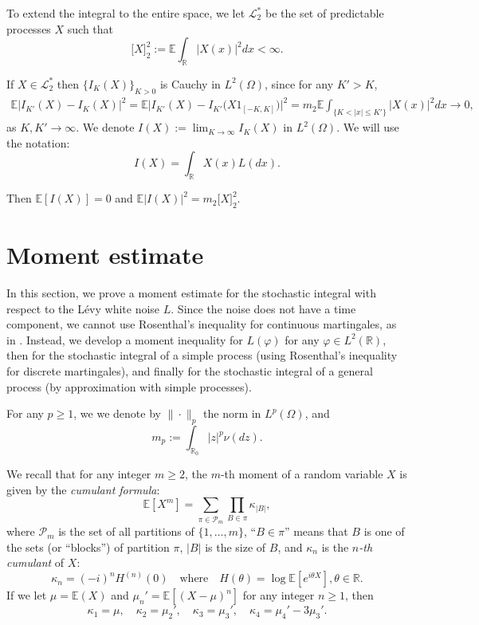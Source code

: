 \documentclass[12pt]{article}
\def\cL{\mathcal{L}}
\def\cP{\mathcal{P}}
\def\bE{\mathbb{E}}
\def\bR{\mathbb{R}}
\def\k{\kappa}
\begin{document}
To extend the integral to the entire space, we let $\cL_2^*$ be the set of predictable processes $X$ such that
\[
\big[X \big]_{2}^2:=\bE\int_{\bR}|X(x)|^2dx<\infty.
\]

If $X \in \cL_2^*$ then $\{I_K(X)\}_{K>0}$ is Cauchy in $L^2(\Omega)$, since for any $K'>K$,
\begin{align*}
\bE|I_{K'}(X)-I_K(X)|^2=\bE\big|I_{K'}(X)-I_{K'}\big(X1_{[-K,K]}\big)\big|^2=m_2\bE\int_{\{K<|x|\leq K'\}}|X(x)|^2 dx \to 0,
\end{align*}
as $K,K' \to \infty$. We denote $I(X):=\lim_{K \to \infty}I_K(X)$ in $L^2(\Omega)$.  We will use the notation:
\[
I(X)=\int_{\bR}X(x)L(dx).
\] 

Then $\bE[I(X)]=0$ and
$\bE|I(X)|^2 =m_2 \big[X \big]_{2}^2$. 


\section{Moment estimate}
\label{section-moment}

In this section, we prove a moment estimate for the stochastic integral with respect to the L\'evy white noise $L$. Since the noise does not have a time component, we cannot use Rosenthal's inequality for continuous martingales, as in \cite{BZ24,BZ26}. Instead, we develop a moment inequality for $L(\varphi)$ for any $\varphi \in L^2(\bR)$, then for the stochastic integral of a simple process (using Rosenthal's inequality for discrete martingales), and finally for the stochastic integral of a general process (by approximation with simple processes).

\medskip


For any $p\geq 1$, we 
we denote by $\|\cdot\|_p$ the norm in $L^p(\Omega)$, and
\[
m_p:=\int_{\bR_0}|z|^p \nu(dz).
\]



We recall that for any integer $m\geq 2$, the $m$-th moment of a random variable $X$ is given by the {\em cumulant formula}:
\[
\bE[X^m]=\sum_{\pi \in \cP_m} \prod_{B \in \pi} \k_{|B|},
\]
where $\cP_{m}$ is the set of all partitions of $\{1,\ldots,m\}$, ``$B \in \pi$'' means that $B$ is one of the sets (or ``blocks'') of partition $\pi$, $|B|$ is the size of $B$, and $\k_n$ is the {\em $n$-th cumulant} of $X$:
\[
\k_n=(-i)^n H^{(n)}(0) \quad \mbox{where} \quad H(\theta)=\log \bE[e^{i\theta X}],\theta \in \bR.
\]
If we let $\mu=\bE(X)$ and $\mu_n'=\bE[(X-\mu)^n]$ for any integer $n \geq 1$, then
\[
\k_1=\mu, \quad \k_2=\mu_2', \quad \k_3=\mu_3', \quad \k_4=\mu_4'-3\mu_3'.
\]
\end{document}
